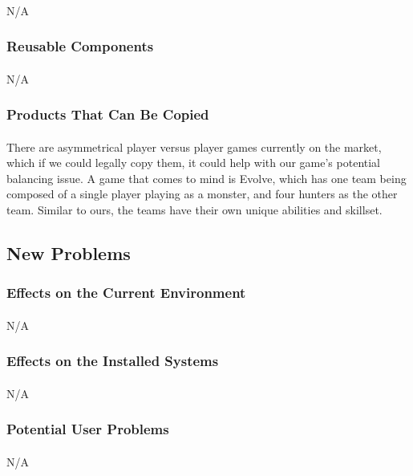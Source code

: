 \documentclass[12pt, titlepage]{article}
\begin{document}
\paragraph{}N/A
\subsubsection{Reusable Components}
\paragraph{}N/A
\subsubsection{Products That Can Be Copied}
\paragraph{}There are asymmetrical player versus player games currently on the market, which if we could legally copy them, it could help with our game's potential balancing issue. A game that comes to mind is Evolve, which has one team being composed of a single player playing as a monster, and four hunters as the other team. Similar to ours, the teams have their own unique abilities and skillset. 
\subsection{New Problems}
\subsubsection{Effects on the Current Environment}
\paragraph{}N/A
\subsubsection{Effects on the Installed Systems}
\paragraph{}N/A
\subsubsection{Potential User Problems}
\paragraph{}N/A
\end{document}
